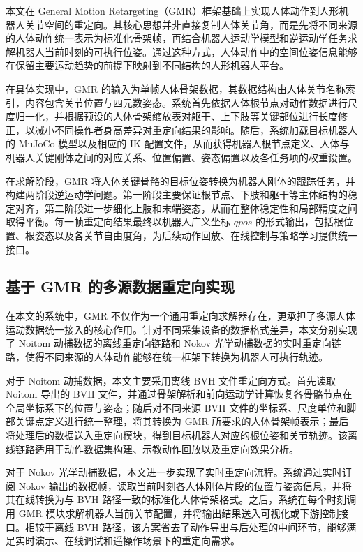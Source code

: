本文在 General Motion Retargeting（GMR）框架基础上实现人体动作到人形机器人关节空间的重定向。其核心思想并非直接复制人体关节角，而是先将不同来源的人体动作统一表示为标准化骨架帧，再结合机器人运动学模型和逆运动学任务求解机器人当前时刻的可执行位姿。通过这种方式，人体动作中的空间位姿信息能够在保留主要运动趋势的前提下映射到不同结构的人形机器人平台。

在具体实现中，GMR 的输入为单帧人体骨架数据，其数据结构由人体关节名称索引，内容包含关节位置与四元数姿态。系统首先依据人体根节点对动作数据进行尺度归一化，并根据预设的人体骨架缩放表对躯干、上下肢等关键部位进行长度修正，以减小不同操作者身高差异对重定向结果的影响。随后，系统加载目标机器人的 MuJoCo 模型以及相应的 IK 配置文件，从而获得机器人根节点定义、人体与机器人关键刚体之间的对应关系、位置偏置、姿态偏置以及各任务项的权重设置。

在求解阶段，GMR 将人体关键骨骼的目标位姿转换为机器人刚体的跟踪任务，并构建两阶段逆运动学问题。第一阶段主要保证根节点、下肢和躯干等主体结构的稳定对齐，第二阶段进一步细化上肢和末端姿态，从而在整体稳定性和局部精度之间取得平衡。每一帧重定向结果最终以机器人广义坐标 $qpos$ 的形式输出，包括根位置、根姿态以及各关节自由度角，为后续动作回放、在线控制与策略学习提供统一接口。

\subsection{基于 GMR 的多源数据重定向实现}

在本文的系统中，GMR 不仅作为一个通用重定向求解器存在，更承担了多源人体运动数据统一接入的核心作用。针对不同采集设备的数据格式差异，本文分别实现了 Noitom 动捕数据的离线重定向链路和 Nokov 光学动捕数据的实时重定向链路，使得不同来源的人体动作能够在统一框架下转换为机器人可执行轨迹。

对于 Noitom 动捕数据，本文主要采用离线 BVH 文件重定向方式。首先读取 Noitom 导出的 BVH 文件，并通过骨架解析和前向运动学计算恢复各骨骼节点在全局坐标系下的位置与姿态；随后对不同来源 BVH 文件的坐标系、尺度单位和脚部关键点定义进行统一整理，将其转换为 GMR 所要求的人体骨架帧表示；最后将处理后的数据送入重定向模块，得到目标机器人对应的根位姿和关节轨迹。该离线链路适用于动作数据集构建、示教动作回放以及重定向效果分析。

对于 Nokov 光学动捕数据，本文进一步实现了实时重定向流程。系统通过实时订阅 Nokov 输出的数据帧，读取当前时刻各人体刚体片段的位置与姿态信息，并将其在线转换为与 BVH 路径一致的标准化人体骨架格式。之后，系统在每个时刻调用 GMR 模块求解机器人当前关节配置，并将输出结果送入可视化或下游控制接口。相较于离线 BVH 路径，该方案省去了动作导出与后处理的中间环节，能够满足实时演示、在线调试和遥操作场景下的重定向需求。

